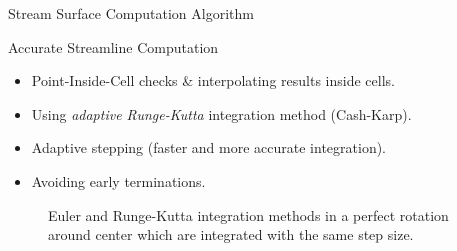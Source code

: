 \documentclass{beamer}
\begin{document}
\begin{frame}{Stream Surface Computation Algorithm \cite{CampPaper}}
	\begin{algorithm}[H]

		\caption{Stream Surface Computation Algorithm \cite{CampPaper}.}
	\end{algorithm}
\end{frame}

\begin{frame}{Accurate Streamline Computation}
	\begin{itemize}
		\item Point-Inside-Cell checks \& interpolating results inside cells.
		\item Using \textit{adaptive Runge-Kutta} integration method (Cash-Karp).
		\item Adaptive stepping (faster and more accurate integration).
		\item Avoiding early terminations.
	\end{itemize}
    \begin{figure}
    	\centering
	    \caption{Euler and Runge-Kutta integration methods in a perfect rotation around center which are integrated with the same step size.}
    \end{figure}
\end{frame}
\end{document}
